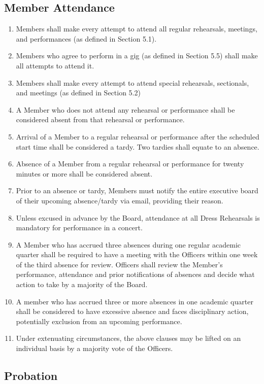\documentclass{article}
\begin{document}
\subsection{Member Attendance} \label{attendance}
\begin{enumerate}
\item Members shall make every attempt to attend all regular rehearsals,
meetings, and performances (as defined in Section 5.1).
\item Members who agree to perform in a gig (as defined in Section
5.5) shall make all attempts to attend it.
\item Members shall make every attempt to attend special rehearsals,
sectionals, and meetings (as defined in Section 5.2)
\item A Member who does not attend any rehearsal or performance
shall be considered absent from that rehearsal or performance.
\item Arrival of a Member to a regular rehearsal or performance
after the scheduled start time shall be considered a tardy. Two tardies
shall equate to an absence.
\item Absence of a Member from a regular rehearsal or performance
for twenty minutes or more shall be considered absent.
\item Prior to an absence or tardy, Members must notify the entire executive board of their upcoming absence/tardy via email, providing their reason.
\item Unless excused in advance by the Board, attendance at all Dress Rehearsals
is mandatory for performance in a concert.
\item A Member who has accrued three absences during one regular
academic quarter shall be required to have a meeting with the Officers
within one week of the third absence for review. Officers shall review
the Member's performance, attendance and prior notifications of absences and decide what action to
take by a majority of the Board.
\item A member who has accrued three or more absences in one academic quarter
shall be considered to have excessive absence and faces disciplinary
action, potentially exclusion from an upcoming performance.
\item Under extenuating circumstances, the above clauses may be lifted on
an individual basis by a majority vote of the Officers.
\end{enumerate}

\subsection{Probation}
\end{document}
